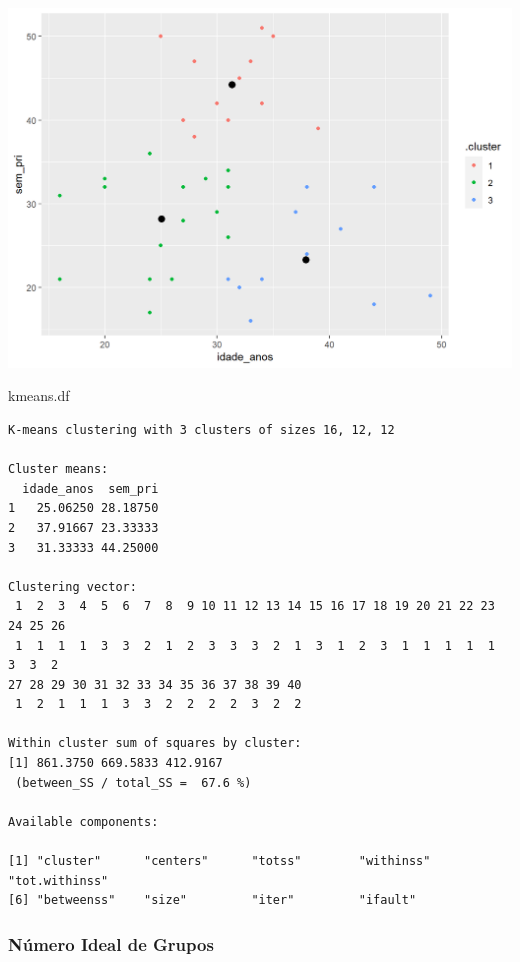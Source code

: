 \documentclass[
  letterpaper,
  DIV=11,
  numbers=noendperiod]{scrreprt}
\newenvironment{Shaded}{\begin{snugshade}}{\end{snugshade}}
\newcommand{\NormalTok}[1]{\textcolor[rgb]{0.00,0.23,0.31}{#1}}
\begin{document}
\includegraphics{./figuras_naosupervisionado/unnamed-chunk-16-1.png}

\begin{Shaded}
\begin{Highlighting}[]
\NormalTok{kmeans.df}
\end{Highlighting}
\end{Shaded}

\begin{verbatim}
K-means clustering with 3 clusters of sizes 16, 12, 12

Cluster means:
  idade_anos  sem_pri
1   25.06250 28.18750
2   37.91667 23.33333
3   31.33333 44.25000

Clustering vector:
 1  2  3  4  5  6  7  8  9 10 11 12 13 14 15 16 17 18 19 20 21 22 23 24 25 26 
 1  1  1  1  3  3  2  1  2  3  3  3  2  1  3  1  2  3  1  1  1  1  1  3  3  2 
27 28 29 30 31 32 33 34 35 36 37 38 39 40 
 1  2  1  1  1  3  3  2  2  2  2  3  2  2 

Within cluster sum of squares by cluster:
[1] 861.3750 669.5833 412.9167
 (between_SS / total_SS =  67.6 %)

Available components:

[1] "cluster"      "centers"      "totss"        "withinss"     "tot.withinss"
[6] "betweenss"    "size"         "iter"         "ifault"      
\end{verbatim}

\hypertarget{nuxfamero-ideal-de-grupos}{%
\subsubsection{Número Ideal de Grupos}\label{nuxfamero-ideal-de-grupos}}
\end{document}

